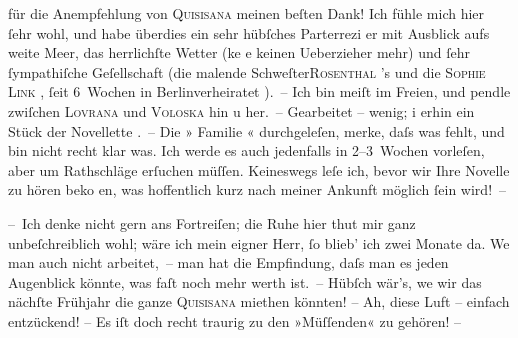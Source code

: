                für die Anempfehlung von 
               \textsc{Quisisana}
                meinen beſten Dank! Ich fühle mich hier ſehr wohl, und habe überdies ein sehr
               hübſches Parterrezi
               {\geminationm}
               er mit Ausblick aufs weite Meer, das
               herrlichſte Wetter (ke
               {\geminationn}
               e keinen Ueberzieher mehr) und
               ſehr ſympathiſche Geſellschaft (die malende 
               Schweſter\textsc{Rosenthal}
               ’s und die 
               \textsc{Sophie Link}
               , ſeit 6 Wochen in 
               Berlinverheiratet
               ). – Ich bin
               meiſt im Freien, und pendle zwiſchen 
               \textsc{Lovrana}
                und 
               \textsc{Voloska}
               hin u her. – Gearbeitet – wenig; i
               {\geminationm}
               erhin ein Stück der 
               Novellette
               . – Die »
               Familie
               « durchgeleſen, merke, daſs was fehlt, und bin nicht recht klar was.
               Ich werde es auch jedenfalls in 2–3 Wochen vorleſen, aber um Rathschläge erſuchen
               müſſen. Keineswegs leſe ich, bevor wir Ihre 
               Novelle
                zu hören beko
               {\geminationm}
               en, was
               hoffentlich kurz nach meiner Ankunft möglich ſein wird! –
            \pend
           
\pstart
           
               – Ich denke nicht gern ans Fortreiſen; die Ruhe hier thut mir ganz unbeſchreiblich
               wohl; wäre ich mein eigner Herr, ſo blieb’ ich zwei Monate da. We
               {\geminationn}
                man auch nicht 
               {\pb}
               arbeitet, – man hat die Empfindung, daſs man es jeden Augenblick könnte, was faſt
               noch mehr werth ist. – Hübſch wär’s, we
               {\geminationn}
                wir das nächſte
               Frühjahr die ganze 
               \textsc{Quisisana}
                miethen könnten! – Ah, diese Luft – einfach entzückend! – Es iſt doch recht
               traurig zu den »Müſſenden« zu gehören! –
            \pend
           
